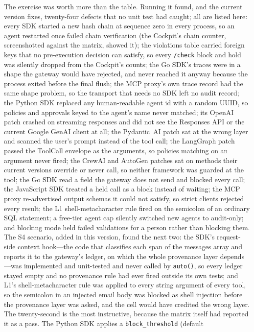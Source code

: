 The exercise was worth more than the table. Running it found, and the
current version fixes, twenty-four defects that no unit test had caught; all are listed here: every SDK started a new hash chain at sequence zero in every
process, so an agent restarted once failed chain verification (the
Cockpit's chain counter, screenshotted against the matrix, showed it);
the violations table carried foreign keys that no pre-execution decision
can satisfy, so every \texttt{/check} block and hold was silently dropped
from the Cockpit's counts; the Go SDK's traces were in a shape the
gateway would have rejected, and never reached it anyway because the
process exited before the final flush; the MCP proxy's own trace record
had the same shape problem, so the transport that needs no SDK left no
audit record;
the Python SDK replaced any human-readable agent id with a
random UUID, so policies and approvals keyed to the agent's name never
matched; its OpenAI patch crashed on streaming responses and did not see
the Responses API or the current Google GenAI client at all; the
Pydantic~AI patch sat at the wrong layer and scanned the user's prompt
instead of the tool call; the LangGraph patch passed the ToolCall
envelope as the arguments, so policies matching on an argument never
fired; the CrewAI and AutoGen patches sat on methods their current
versions override or never call, so neither framework was guarded at
the tool; the Go SDK read a field the gateway does not send and blocked
every call; the JavaScript SDK treated a held call as a block instead of
waiting; the MCP proxy re-advertised output schemas it could not satisfy,
so strict clients rejected every result; the L1 shell-metacharacter rule
fired on the semicolon of an ordinary SQL statement; a free-tier agent
cap silently switched new agents to audit-only; and blocking mode held
failed validations for a person rather than blocking them. The S4
scenario, added in this version, found the next two: the SDK's request-side
context hook---the code that classifies each span of the messages array
and reports it to the gateway's ledger, on which the whole provenance
layer depends---was implemented and unit-tested and never called by
\texttt{auto()}, so every ledger stayed empty and no provenance rule had
ever fired outside its own tests; and L1's shell-metacharacter rule was
applied to every string argument of every tool, so the semicolon in an
injected email body was blocked as shell injection before the provenance
layer was asked, and the cell would have credited the wrong layer. The twenty-second is the most instructive, because the matrix itself had reported it as a pass. The Python SDK applies a \texttt{block\_threshold} (default
